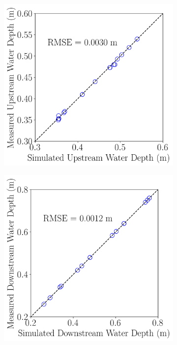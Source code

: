 \documentclass[preview, border=2pt]{standalone}
\begin{document}
\begin{figure}
     \centering
     \begin{subfigure}[b]{0.32\textwidth}
         \centering
         \caption{}
         \includegraphics[width=\textwidth]{calibration_results_Cd_upstream_water_depth.png}
     \end{subfigure}
     \hfill     
     \begin{subfigure}[b]{0.32\textwidth}
         \centering
         \caption{}
         \includegraphics[width=\textwidth]{calibration_results_Cd_downstream_water_depth.png}

\end{subfigure}
\end{figure}
\end{document}
